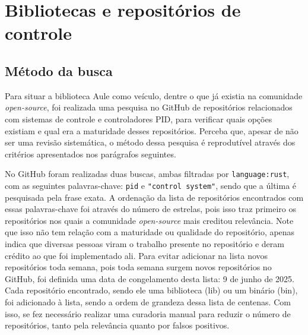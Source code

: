 
\section{Bibliotecas e repositórios de controle}
\label{sec:control-repos}

\subsection{Método da busca}
\label{subsec:control-repos-method}

Para situar a biblioteca Aule como veículo, dentre o que já existia na comunidade \textit{open-source}, foi realizada uma pesquisa no GitHub de repositórios relacionados com sistemas de controle e controladores \ac{PID}, para verificar quais opções existiam e qual era a maturidade desses repositórios. Perceba que, apesar de não ser uma revisão sistemática, o método dessa pesquisa é reprodutível através dos critérios apresentados nos parágrafos seguintes.

No GitHub foram realizadas duas buscas, ambas filtradas por \texttt{language:rust}, com as seguintes palavras-chave: \texttt{pid} e \texttt{"control system"}, sendo que a última é pesquisada pela frase exata. A ordenação da lista de repositórios encontrados com essas palavras-chave foi através do número de estrelas, pois isso traz primeiro os repositórios nos quais a comunidade \textit{open-source} mais creditou relevância. Note que isso não tem relação com a maturidade ou qualidade do repositório, apenas indica que diversas pessoas viram o trabalho presente no repositório e deram crédito ao que foi implementado ali. Para evitar adicionar na lista novos repositórios toda semana, pois toda semana surgem novos repositórios no GitHub, foi definida uma data de congelamento desta lista: 9 de junho de 2025. Cada repositório encontrado, sendo ele uma biblioteca (lib) ou um binário (bin), foi adicionado à lista, sendo a ordem de grandeza dessa lista de centenas. Com isso, se fez necessário realizar uma curadoria manual para reduzir o número de repositórios, tanto pela relevância quanto por falsos positivos.

